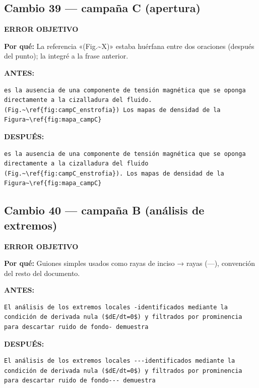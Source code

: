 \documentclass[11pt,a4paper]{article}
\begin{document}
\subsection*{Cambio 39 --- campaña C (apertura)}
\colorbox{okbg}{\textbf{\footnotesize ERROR OBJETIVO}}

\textbf{Por qué:} La referencia «(Fig.\textasciitilde{}X)» estaba huérfana entre dos oraciones (después del punto); la integré a la frase anterior.

\textcolor{antesline}{\textbf{ANTES:}}
\begin{Verbatim}[breaklines=true, breakanywhere=true, fontsize=\small, frame=leftline, rulecolor=\color{antesline}, framerule=1.2pt]
es la ausencia de una componente de tensión magnética que se oponga directamente a la cizalladura del fluido. (Fig.~\ref{fig:campC_enstrofia}) Los mapas de densidad de la Figura~\ref{fig:mapa_campC}
\end{Verbatim}
\textcolor{despline}{\textbf{DESPUÉS:}}
\begin{Verbatim}[breaklines=true, breakanywhere=true, fontsize=\small, frame=leftline, rulecolor=\color{despline}, framerule=1.2pt]
es la ausencia de una componente de tensión magnética que se oponga directamente a la cizalladura del fluido (Fig.~\ref{fig:campC_enstrofia}). Los mapas de densidad de la Figura~\ref{fig:mapa_campC}
\end{Verbatim}

\subsection*{Cambio 40 --- campaña B (análisis de extremos)}
\colorbox{okbg}{\textbf{\footnotesize ERROR OBJETIVO}}

\textbf{Por qué:} Guiones simples usados como rayas de inciso → rayas (---), convención del resto del documento.

\textcolor{antesline}{\textbf{ANTES:}}
\begin{Verbatim}[breaklines=true, breakanywhere=true, fontsize=\small, frame=leftline, rulecolor=\color{antesline}, framerule=1.2pt]
El análisis de los extremos locales -identificados mediante la condición de derivada nula ($dE/dt=0$) y filtrados por prominencia para descartar ruido de fondo- demuestra
\end{Verbatim}
\textcolor{despline}{\textbf{DESPUÉS:}}
\begin{Verbatim}[breaklines=true, breakanywhere=true, fontsize=\small, frame=leftline, rulecolor=\color{despline}, framerule=1.2pt]
El análisis de los extremos locales ---identificados mediante la condición de derivada nula ($dE/dt=0$) y filtrados por prominencia para descartar ruido de fondo--- demuestra
\end{Verbatim}
\end{document}
